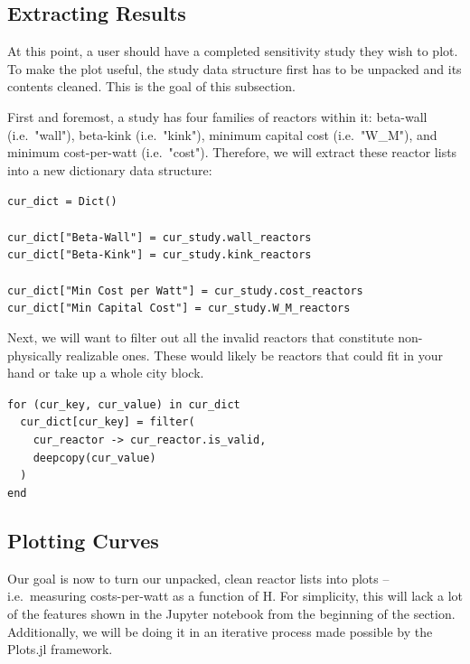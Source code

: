 \subsection{Extracting Results}

At this point, a user should have a completed sensitivity study they wish to plot. To make the plot useful, the study data structure first has to be unpacked and its contents cleaned. This is the goal of this subsection.

First and foremost, a study has four families of reactors within it: beta-wall (i.e.\ "wall"), beta-kink (i.e.\ "kink"), minimum capital cost (i.e.\ "W\_M"), and minimum cost-per-watt (i.e.\ "cost"). Therefore, we will extract these reactor lists into a new dictionary data structure:

\begin{addmargin}[1.5em]{1.5em}
\texttt{cur\_dict = Dict() \\ ~ \\
cur\_dict["Beta-Wall"] = cur\_study.wall\_reactors \\
cur\_dict["Beta-Kink"] = cur\_study.kink\_reactors \\ ~ \\
cur\_dict["Min Cost per Watt"] = cur\_study.cost\_reactors \\
cur\_dict["Min Capital Cost"] = cur\_study.W\_M\_reactors
}
\end{addmargin}

Next, we will want to filter out all the invalid reactors that constitute non-physically realizable ones. These would likely be reactors that could fit in your hand or take up a whole city block.

\begin{addmargin}[1.5em]{1.5em}
\texttt{for (cur\_key, cur\_value) in cur\_dict \\
\-\ \-\ cur\_dict[cur\_key] = filter( \\
\-\ \-\ \-\ \-\ cur\_reactor -> cur\_reactor.is\_valid, \\
\-\ \-\ \-\ \-\ deepcopy(cur\_value) \\
\-\ \-\ ) \\
end
}
\end{addmargin}

\subsection{Plotting Curves}

Our goal is now to turn our unpacked, clean reactor lists into plots -- i.e.\ measuring costs-per-watt as a function of H. For simplicity, this will lack a lot of the features shown in the Jupyter notebook from the beginning of the section. Additionally, we will be doing it in an iterative process made possible by the Plots.jl framework.

